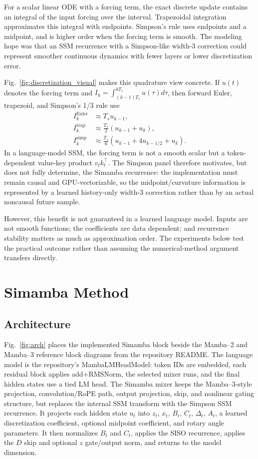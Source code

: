 \documentclass[conference]{IEEEtran}
\newcommand{\modelname}{Simamba\xspace}
\begin{document}
For a scalar linear ODE with a forcing term, the exact discrete update contains an integral of the input forcing over the interval. Trapezoidal integration approximates this integral with endpoints. Simpson's rule uses endpoints and a midpoint, and is higher order when the forcing term is smooth. The modeling hope was that an SSM recurrence with a Simpson-like width-3 correction could represent smoother continuous dynamics with fewer layers or lower discretization error.

Fig.~\ref{fig:discretization_visual} makes this quadrature view concrete. If $u(t)$ denotes the forcing term and $I_k=\int_{(k-1)T_s}^{kT_s}u(\tau)d\tau$, then forward Euler, trapezoid, and Simpson's 1/3 rule use
\begin{align}
I_k^{\mathrm{Euler}} &\approx T_s u_{k-1},\\
I_k^{\mathrm{trap}} &\approx \frac{T_s}{2}(u_{k-1}+u_k),\\
I_k^{\mathrm{simp}} &\approx \frac{T_s}{6}(u_{k-1}+4u_{k-1/2}+u_k).
\end{align}
In a language-model SSM, the forcing term is not a smooth scalar but a token-dependent value-key product $v_tk_t^\top$. The Simpson panel therefore motivates, but does not fully determine, the \modelname recurrence: the implementation must remain causal and GPU-vectorizable, so the midpoint/curvature information is represented by a learned history-only width-3 correction rather than by an actual noncausal future sample.

However, this benefit is not guaranteed in a learned language model. Inputs are not smooth functions; the coefficients are data dependent; and recurrence stability matters as much as approximation order. The experiments below test the practical outcome rather than assuming the numerical-method argument transfers directly.

\section{\modelname{} Method}

\subsection{Architecture}

Fig.~\ref{fig:arch} places the implemented \modelname block beside the Mamba--2 and Mamba--3 reference block diagrams from the repository README. The language model is the repository's MambaLMHeadModel: token IDs are embedded, each residual block applies add+RMSNorm, the selected mixer runs, and the final hidden states use a tied LM head. The \modelname mixer keeps the Mamba--3-style projection, convolution/RoPE path, output projection, skip, and nonlinear gating structure, but replaces the internal SSM transform with the Simpson SSM recurrence. It projects each hidden state $u_t$ into $z_t$, $x_t$, $B_t$, $C_t$, $\Delta_t$, $A_t$, a learned discretization coefficient, optional midpoint coefficient, and rotary angle parameters. It then normalizes $B_t$ and $C_t$, applies the SISO recurrence, applies the $D$ skip and optional $z$ gate/output norm, and returns to the model dimension.
\end{document}
